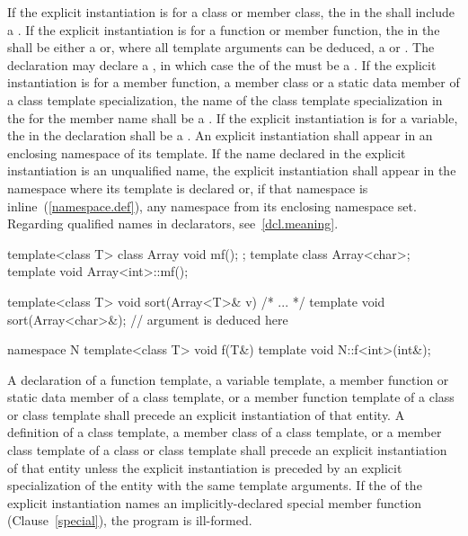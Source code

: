 \pnum
If the explicit instantiation is for a class or member class, the
 in the  shall
include a . If the explicit instantiation is for
a function or member function,
the
in the
shall be either a
or, where all template arguments can be deduced, a
 or .
\enternote
The declaration may declare a
,
in which case the
of the
must be a
.
\exitnote
If the explicit instantiation is for a member function, a member class or
a static data member of a class template specialization,
the name of the class template specialization in the
for the member name shall be a .
If the explicit instantiation is for a variable, the
 in the declaration shall be a
.
An explicit instantiation shall appear in an enclosing namespace
of its template. If the name declared in the explicit
instantiation is an unqualified name, the explicit instantiation
shall appear in the namespace where its template is declared or, if that
namespace is inline~(\ref{namespace.def}), any namespace from its enclosing
namespace set.
\enternote
Regarding qualified names in declarators, see~\ref{dcl.meaning}.
\exitnote
\enterexample

\begin{codeblock}
template<class T> class Array { void mf(); };
template class Array<char>;
template void Array<int>::mf();

template<class T> void sort(Array<T>& v) { /* ... */ }
template void sort(Array<char>&);       // argument is deduced here

namespace N {
  template<class T> void f(T&) { }
}
template void N::f<int>(int&);
\end{codeblock}
\exitexample

\pnum
A declaration of a function template, a variable template, a member function
or static data member
of a class template, or a member function template of a class or class
template shall precede an explicit instantiation of that entity. A definition
of a class template, a member class of a class template, or a member class
template of a class or class template shall precede an explicit instantiation
of that entity unless the explicit instantiation is preceded by an explicit
specialization of the entity with the same template arguments.
If the
of the explicit instantiation names an implicitly-declared special member
function (Clause~\ref{special}), the program is ill-formed.

